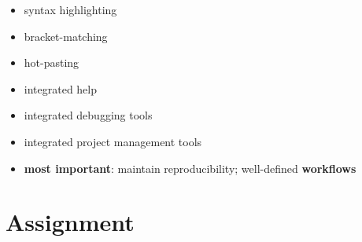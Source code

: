 \documentclass[]{tufte-handout}
\begin{document}
\begin{itemize}
\item
  syntax highlighting
\item
  bracket-matching
\item
  hot-pasting
\item
  integrated help
\item
  integrated debugging tools
\item
  integrated project management tools
\item
  \textbf{most important}: maintain reproducibility; well-defined
  \textbf{workflows}
\end{itemize}

\section{Assignment}\label{assignment}
\end{document}
